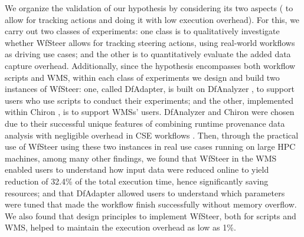 We organize the validation of our hypothesis by considering its two aspects (\ie{} to allow for tracking actions and doing it with low execution overhead).
For this, we carry out two classes of experiments: one class is to qualitatively investigate whether WfSteer allows for tracking steering actions, using real-world workflows as driving use cases; and the other is to quantitatively evaluate the added data capture overhead.
Additionally, since the hypothesis encompasses both workflow scripts and WMS, within each class of experiments we design and build two instances of WfSteer:
one, called DfAdapter,
is built on DfAnalyzer \cite{Silva2017Raw,Camata2018In,silva_dfanalyzer:_2018}, to support users who use scripts to conduct their experiments;
and the other, implemented within Chiron  \cite{Dias2015Data-centric,Goncalves2013Performance,Santos2013Runtime,Souza2015Parallel}, is to support WMSs' users.
DfAnalyzer and Chiron were chosen due to their successful unique features of combining runtime provenance data analysis with negligible overhead in CSE workflows \cite{Camata2018In,Souza2015Parallel}. 
Then, through the practical use of WfSteer using these two instances in real use cases running on large HPC machines,
among many other findings,
we found that WfSteer in the WMS enabled users to understand how input data were reduced online to yield reduction of 32.4\% of the total execution time, hence significantly saving resources; and that DfAdapter allowed users to understand which parameters were tuned that made the workflow finish successfully without memory overflow.
We also found that design principles to implement WfSteer, both for scripts and WMS, helped to maintain the execution overhead as low as 1\%.


